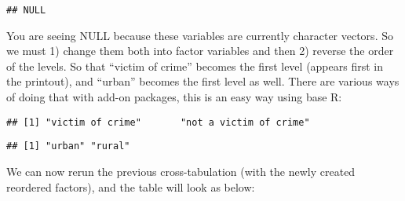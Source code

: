 \documentclass[
]{book}
\newenvironment{Shaded}{\begin{snugshade}}{\end{snugshade}}
\newcommand{\AttributeTok}[1]{\textcolor[rgb]{0.13,0.29,0.53}{#1}}
\newcommand{\FunctionTok}[1]{\textcolor[rgb]{0.13,0.29,0.53}{\textbf{#1}}}
\newcommand{\NormalTok}[1]{#1}
\newcommand{\OtherTok}[1]{\textcolor[rgb]{0.56,0.35,0.01}{#1}}
\newcommand{\SpecialCharTok}[1]{\textcolor[rgb]{0.81,0.36,0.00}{\textbf{#1}}}
\newcommand{\StringTok}[1]{\textcolor[rgb]{0.31,0.60,0.02}{#1}}
\begin{document}
\begin{verbatim}
## NULL
\end{verbatim}

You are seeing NULL because these variables are currently character vectors. So we must 1) change them both into factor variables and then 2) reverse the order of the levels. So that ``victim of crime'' becomes the first level (appears first in the printout), and ``urban'' becomes the first level as well. There are various ways of doing that with add-on packages, this is an easy way using base R:

\begin{Shaded}
\end{Shaded}

\begin{verbatim}
## [1] "victim of crime"       "not a victim of crime"
\end{verbatim}

\begin{Shaded}
\end{Shaded}

\begin{verbatim}
## [1] "urban" "rural"
\end{verbatim}

We can now rerun the previous cross-tabulation (with the newly created reordered factors), and the table will look as below:
\end{document}
